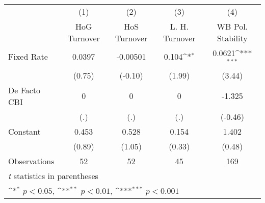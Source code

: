 \begin{table}[htbp]\centering
\def\sym#1{\ifmmode^{#1}\else\(^{#1}\)\fi}
\caption{\label{hiKfivs4}}
\begin{tabular}{l*{4}{c}}
\toprule
                                        &\multicolumn{1}{c}{(1)}&\multicolumn{1}{c}{(2)}&\multicolumn{1}{c}{(3)}&\multicolumn{1}{c}{(4)}\\
                                        &\multicolumn{1}{c}{HoG Turnover}&\multicolumn{1}{c}{HoS Turnover}&\multicolumn{1}{c}{L. H. Turnover}&\multicolumn{1}{c}{WB Pol. Stability}\\
\midrule
Fixed Rate                              &   0.0397         & -0.00501         &    0.104\sym{*}  &   0.0621\sym{***}\\
                                        &   (0.75)         &  (-0.10)         &   (1.99)         &   (3.44)         \\
\addlinespace
De Facto CBI                            &        0         &        0         &        0         &   -1.325         \\
                                        &      (.)         &      (.)         &      (.)         &  (-0.46)         \\
\addlinespace
Constant                                &    0.453         &    0.528         &    0.154         &    1.402         \\
                                        &   (0.89)         &   (1.05)         &   (0.33)         &   (0.48)         \\
\midrule
Observations                            &       52         &       52         &       45         &      169         \\
\bottomrule
\multicolumn{5}{l}{\footnotesize \textit{t} statistics in parentheses}\\
\multicolumn{5}{l}{\footnotesize \sym{*} \(p<0.05\), \sym{**} \(p<0.01\), \sym{***} \(p<0.001\)}\\
\end{tabular}
\end{table}
